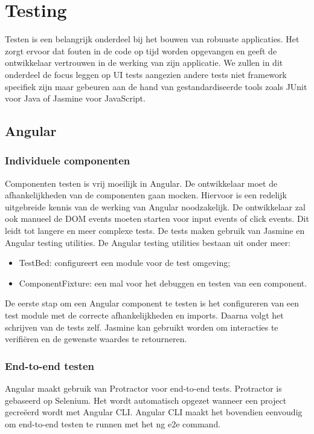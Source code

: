 \section{Testing}
Testen is een belangrijk onderdeel bij het bouwen van robuuste applicaties. Het zorgt ervoor dat fouten in de code op tijd worden opgevangen en geeft de ontwikkelaar vertrouwen in de werking van zijn applicatie. We zullen in dit onderdeel de focus leggen op UI tests aangezien andere tests niet framework specifiek zijn maar gebeuren aan de hand van gestandardiseerde tools zoals JUnit voor Java of Jasmine voor JavaScript.

\subsection{Angular}
\subsubsection{Individuele componenten}
Componenten testen is vrij moeilijk in Angular. De ontwikkelaar moet de afhankelijkheden van de componenten gaan mocken. Hiervoor is een redelijk uitgebreide kennis van de werking van Angular noodzakelijk. De ontwikkelaar zal ook manueel de DOM events moeten starten voor input events of click events. 
Dit leidt tot langere en meer complexe tests. De tests maken gebruik van Jasmine en  Angular testing utilities. De Angular testing utilities bestaan uit onder meer:
\begin{itemize}
	\item TestBed: configureert een module voor de test omgeving;
	\item ComponentFixture: een mal voor het debuggen en testen van een component.
\end{itemize}

De eerste stap om een Angular component te testen is het configureren van een test module met de correcte afhankelijkheden en imports.
Daarna volgt het schrijven van de tests zelf. Jasmine kan gebruikt worden om interacties te verifiëren en de gewenste waardes te retourneren. 

\subsubsection{End-to-end testen}
Angular maakt gebruik van Protractor voor end-to-end tests. Protractor is gebaseerd op Selenium. Het wordt automatisch opgezet wanneer een project gecreëerd wordt met Angular CLI.
Angular CLI maakt het bovendien eenvoudig om end-to-end testen te runnen met het ng e2e command.

